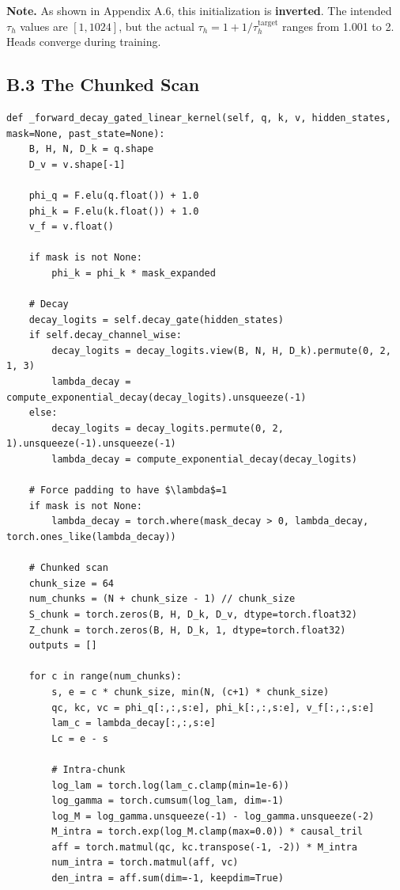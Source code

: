 \textbf{Note.} As shown in Appendix A.6, this initialization is \textbf{inverted}. 
The intended $\tau_h$ values are $[1, 1024]$, but the actual $\tau_h = 1 + 1/\tau_h^\text{target}$ 
ranges from 1.001 to 2. Heads converge during training.

\subsection{B.3 The Chunked Scan}

\begin{lstlisting}
def _forward_decay_gated_linear_kernel(self, q, k, v, hidden_states, mask=None, past_state=None):
    B, H, N, D_k = q.shape
    D_v = v.shape[-1]
    
    phi_q = F.elu(q.float()) + 1.0
    phi_k = F.elu(k.float()) + 1.0
    v_f = v.float()
    
    if mask is not None:
        phi_k = phi_k * mask_expanded
    
    # Decay
    decay_logits = self.decay_gate(hidden_states)
    if self.decay_channel_wise:
        decay_logits = decay_logits.view(B, N, H, D_k).permute(0, 2, 1, 3)
        lambda_decay = compute_exponential_decay(decay_logits).unsqueeze(-1)
    else:
        decay_logits = decay_logits.permute(0, 2, 1).unsqueeze(-1).unsqueeze(-1)
        lambda_decay = compute_exponential_decay(decay_logits)
    
    # Force padding to have $\lambda$=1
    if mask is not None:
        lambda_decay = torch.where(mask_decay > 0, lambda_decay, torch.ones_like(lambda_decay))
    
    # Chunked scan
    chunk_size = 64
    num_chunks = (N + chunk_size - 1) // chunk_size
    S_chunk = torch.zeros(B, H, D_k, D_v, dtype=torch.float32)
    Z_chunk = torch.zeros(B, H, D_k, 1, dtype=torch.float32)
    outputs = []
    
    for c in range(num_chunks):
        s, e = c * chunk_size, min(N, (c+1) * chunk_size)
        qc, kc, vc = phi_q[:,:,s:e], phi_k[:,:,s:e], v_f[:,:,s:e]
        lam_c = lambda_decay[:,:,s:e]
        Lc = e - s
        
        # Intra-chunk
        log_lam = torch.log(lam_c.clamp(min=1e-6))
        log_gamma = torch.cumsum(log_lam, dim=-1)
        log_M = log_gamma.unsqueeze(-1) - log_gamma.unsqueeze(-2)
        M_intra = torch.exp(log_M.clamp(max=0.0)) * causal_tril
        aff = torch.matmul(qc, kc.transpose(-1, -2)) * M_intra
        num_intra = torch.matmul(aff, vc)
        den_intra = aff.sum(dim=-1, keepdim=True)
        

\end{lstlisting}
